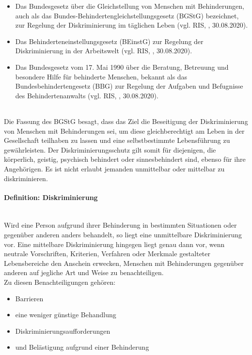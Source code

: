 \begin{itemize}
    \item Das Bundesgesetz über die Gleichstellung von Menschen mit Behinderungen, auch als das Bundes-Behindertengleichstellungsgesetz (BGStG) bezeichnet, zur Regelung der Diskriminierung im täglichen Leben (vgl. RIS, \cite{ris_bgstg_2020}, 30.08.2020).
    \item Das Behinderteneinstellungsgesetz (BEinstG) zur Regelung der Diskriminierung in der Arbeitswelt (vgl. RIS, \cite{ris_beinstg_2020}, 30.08.2020).
    \item Das Bundesgesetz vom 17. Mai 1990 über die Beratung, Betreuung und besondere Hilfe für behinderte Menschen, bekannt als das Bundesbehindertengesetz (BBG) zur Regelung der Aufgaben und Befugnisse des Behindertenanwalts (vgl. RIS, \cite{ris_bbg_2020}, 30.08.2020).
\end{itemize}

\mbox{}\\
Die Fassung des BGStG besagt, dass das Ziel die Beseitigung der Diskriminierung von Menschen mit Behinderungen sei, um diese gleichberechtigt am Leben in der Gesellschaft teilhaben zu lassen und eine selbstbestimmte Lebensführung zu gewährleisten. Der Diskriminierungsschutz gilt somit für diejenigen, die körperlich, geistig, psychisch behindert oder sinnesbehindert sind, ebenso für ihre Angehörigen. Es ist nicht erlaubt jemanden unmittelbar oder mittelbar zu diskriminieren.

\paragraph{Definition: Diskriminierung}\mbox{}\\
Wird eine Person aufgrund ihrer Behinderung in bestimmten Situationen oder gegenüber anderen anders behandelt, so liegt eine unmittelbare Diskriminierung vor. Eine mittelbare Diskriminierung hingegen liegt genau dann vor, wenn neutrale Vorschriften, Kriterien, Verfahren oder Merkmale gestalteter Lebensbereiche den Anschein erwecken, Menschen mit Behinderungen gegenüber anderen auf jegliche Art und Weise zu benachteiligen.\\
Zu diesen Benachteiligungen gehören: 
\begin{itemize}
    \item Barrieren
    \item eine weniger günstige Behandlung
    \item Diskriminierungsaufforderungen
    \item und Belästigung aufgrund einer Behinderung
\end{itemize}


